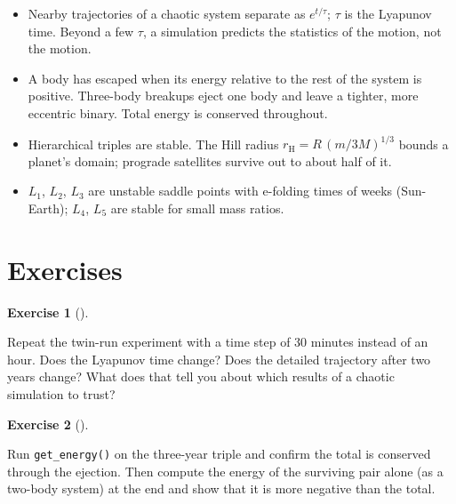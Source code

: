 \documentclass[
  10.5pt,
  letterpaper,
]{scrbook}
\providecommand{\tightlist}{%
  \setlength{\itemsep}{0pt}\setlength{\parskip}{0pt}}
\theoremstyle{definition}
\newtheorem{exercise}{Exercise}[chapter]
\theoremstyle{plain}
\theoremstyle{remark}
\begin{document}
\begin{tcolorbox}[enhanced jigsaw, arc=.35mm, bottomrule=.15mm, bottomtitle=1mm, breakable, colback=white, colbacktitle=quarto-callout-tip-color!10!white, colframe=quarto-callout-tip-color-frame, coltitle=black, left=2mm, leftrule=.75mm, opacityback=0, opacitybacktitle=0.6, rightrule=.15mm, title={Key results}, titlerule=0mm, toprule=.15mm, toptitle=1mm]

\begin{itemize}
\tightlist
\item
  Nearby trajectories of a chaotic system separate as \(e^{t/\tau}\);
  \(\tau\) is the Lyapunov time. Beyond a few \(\tau\), a simulation
  predicts the statistics of the motion, not the motion.
\item
  A body has escaped when its energy relative to the rest of the system
  is positive. Three-body breakups eject one body and leave a tighter,
  more eccentric binary. Total energy is conserved throughout.
\item
  Hierarchical triples are stable. The Hill radius
  \(r_{\mathrm{H}} = R\,(m/3M)^{1/3}\) bounds a planet's domain;
  prograde satellites survive out to about half of it.
\item
  \(L_1\), \(L_2\), \(L_3\) are unstable saddle points with e-folding
  times of weeks (Sun-Earth); \(L_4\), \(L_5\) are stable for small mass
  ratios.
\end{itemize}

\end{tcolorbox}

\section*{Exercises}\label{exercises-10}


\begin{exercise}[]\protect\hypertarget{exr-ch11-lyapunov-step}{}\label{exr-ch11-lyapunov-step}

Repeat the twin-run experiment with a time step of 30 minutes instead of
an hour. Does the Lyapunov time change? Does the detailed trajectory
after two years change? What does that tell you about which results of a
chaotic simulation to trust?

\end{exercise}

\begin{exercise}[]\protect\hypertarget{exr-ch11-energy-check}{}\label{exr-ch11-energy-check}

Run \texttt{get\_energy()} on the three-year triple and confirm the
total is conserved through the ejection. Then compute the energy of the
surviving pair alone (as a two-body system) at the end and show that it
is more negative than the total.

\end{exercise}
\end{document}
